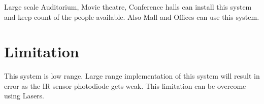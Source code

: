 \documentclass[conference]{IEEEtran}
\begin{document}
\subsubsection{}
 Large scale Auditorium, Movie theatre, Conference halls can install this system and keep count of the people available. Also Mall and Offices can use this system.
 
 
 \section{Limitation}
 This system is low range. Large range implementation of this system will result in error as the IR sensor photodiode gets weak. This limitation can be overcome using Lasers.


%
%



%
%
\end{document}
